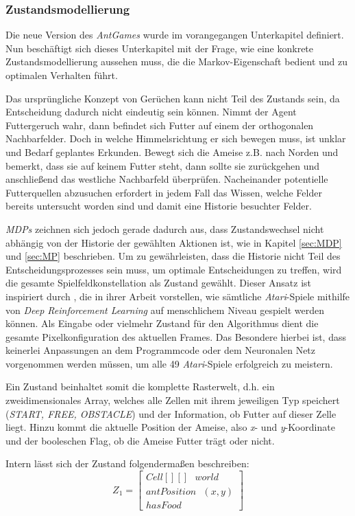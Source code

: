 \subsubsection{Zustandsmodellierung}
Die neue Version des \textit{AntGames} wurde im vorangegangen Unterkapitel definiert. Nun beschäftigt sich dieses Unterkapitel mit der Frage, wie eine konkrete Zustandsmodellierung aussehen muss, die die Markov-Eigenschaft bedient und zu optimalen Verhalten führt.
\par 
Das ursprüngliche Konzept von \glqq Gerüchen\grqq{} kann nicht Teil des Zustands sein, da Entscheidung dadurch nicht eindeutig sein können. Nimmt der Agent Futtergeruch wahr, dann befindet sich Futter auf einem der orthogonalen Nachbarfelder. Doch in welche Himmelsrichtung er sich bewegen muss, ist unklar und Bedarf geplantes Erkunden. Bewegt sich die Ameise z.B. nach Norden und bemerkt, dass sie auf keinem Futter steht, dann sollte sie zurückgehen und anschließend das westliche Nachbarfeld überprüfen. Nacheinander potentielle Futterquellen abzusuchen erfordert in jedem Fall das Wissen, welche Felder bereits untersucht worden sind und damit eine Historie besuchter Felder.
\par 
\textit{MDPs} zeichnen sich jedoch gerade dadurch aus, dass Zustandswechsel nicht abhängig von der Historie der gewählten Aktionen ist, wie in Kapitel \ref{sec:MDP} und \ref{sec:MP} beschrieben. Um zu gewährleisten, dass die Historie nicht Teil des Entscheidungsprozesses sein muss, um optimale Entscheidungen zu treffen, wird die gesamte Spielfeldkonstellation als Zustand gewählt. Dieser Ansatz ist inspiriert durch \cite{dqn}, die in ihrer Arbeit vorstellen, wie sämtliche \textit{Atari}-Spiele mithilfe von \textit{Deep Reinforcement Learning} auf menschlichem Niveau gespielt werden können. Als Eingabe oder vielmehr Zustand für den Algorithmus dient die gesamte Pixelkonfiguration des aktuellen Frames. Das Besondere hierbei ist, dass keinerlei Anpassungen an dem Programmcode oder dem Neuronalen Netz vorgenommen werden müssen, um alle 49 \textit{Atari}-Spiele erfolgreich zu meistern.
\par 
Ein Zustand beinhaltet somit die komplette Rasterwelt, d.h. ein zweidimensionales Array, welches alle Zellen mit ihrem jeweiligen Typ speichert (\textit{START, FREE, OBSTACLE}) und der Information, ob Futter auf dieser Zelle liegt. Hinzu kommt die aktuelle Position der Ameise, also \textit{x}- und \textit{y}-Koordinate und der booleschen Flag, ob die Ameise Futter trägt oder nicht.
\par 
Intern lässt sich der Zustand folgendermaßen beschreiben:
\begin{equation}
Z_{1} =  \begin{bmatrix} Cell[][]\text{ }world\\
                         antPosition\text{ }(x,y) \\
                        hasFood  \end{bmatrix}
\end{equation}

